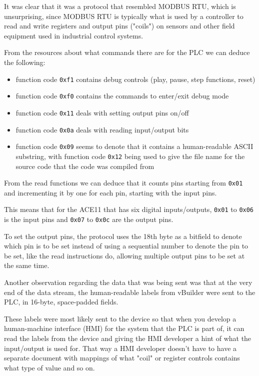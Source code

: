 \documentclass[11pt]{article}
\begin{document}
It was clear that it was a protocol that resembled MODBUS RTU, which is unsurprising, since MODBUS RTU is typically what is used by a controller to read and write registers and output pins ("coils") on sensors and other field equipment used in industrial control systems.

From the resources about what commands there are for the PLC we can deduce the following:

\begin{itemize}
\item function code \texttt{0xf1} contains debug controls (play, pause, step functions, reset)
\item function code \texttt{0xf0} contains the commands to enter/exit debug mode
\item function code \texttt{0x11} deals with setting output pins on/off
\item function code \texttt{0x0a} deals with reading input/output bits
\item function code \texttt{0x09} seems to denote that it contains a human-readable ASCII substring, with function code \texttt{0x12} being used to give the file name for the source code that the code was compiled from
\end{itemize}

From the read functions we can deduce that it counts pins starting from \texttt{0x01} and incrementing it by one for each pin, starting with the input pins. 

This means that for the ACE11 that has six digital inputs/outputs, \texttt{0x01} to \texttt{0x06} is the input pins and \texttt{0x07} to \texttt{0x0c} are the output pins.

To set the output pins, the protocol uses the 18th byte as a bitfield to denote which pin is to be set instead of using a sequential number to denote the pin to be set, like the read instructions do, allowing multiple output pins to be set at the same time.

Another observation regarding the data that was being sent was that at the very end of the data stream, the human-readable labels from vBuilder were sent to the PLC, in 16-byte, space-padded fields.

These labels were most likely sent to the device so that when you develop a human-machine interface (HMI) for the system that the PLC is part of, it can read the labels from the device and giving the HMI developer a hint of what the input/output is used for. That way a HMI developer doesn't have to have a separate document with mappings of what "coil" or register controls contains what type of value and so on.
\end{document}
